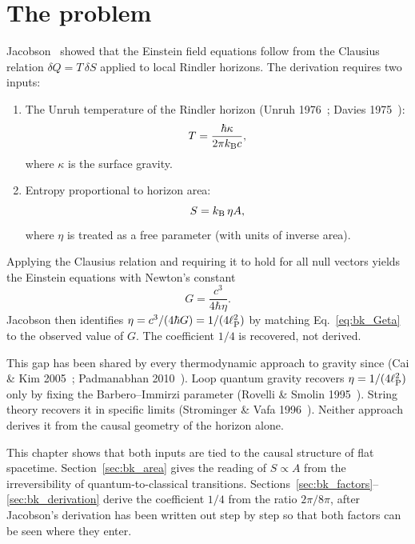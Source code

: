 \section{The problem}\label{sec:bk_problem}
Jacobson~\cite{Jacobson1995} showed that the Einstein field equations follow from the Clausius relation $\delta Q=T\,\delta S$ applied to local
Rindler horizons. The derivation requires two inputs:
\begin{enumerate}
\item The Unruh temperature of the Rindler horizon (Unruh 1976~\cite{Unruh1976}; Davies 1975~\cite{Davies1975}):
\begin{equation}
T=\frac{\hbar\kappa}{2\pi k_{\mathrm B} c},\label{eq:bk_unruh}
\end{equation}
where $\kappa$ is the surface gravity.
\item Entropy proportional to horizon area:
\begin{equation}
S=k_{\mathrm B}\,\eta A,\label{eq:bk_SetaA}
\end{equation}
where $\eta$ is treated as a free parameter (with units of inverse area).
\end{enumerate}
Applying the Clausius relation and requiring it to hold for all null vectors yields the Einstein equations with Newton's constant
\begin{equation}
G=\frac{c^3}{4\hbar\eta}.\label{eq:bk_Geta}
\end{equation}
Jacobson then identifies $\eta=c^3/(4\hbar G)=1/(4\ell_{\mathrm P}^2)$ by matching Eq.~\eqref{eq:bk_Geta} to the observed value of $G$. The coefficient $1/4$ is recovered,
not derived. \derived{}

This gap has been shared by every thermodynamic approach to gravity since (Cai \& Kim 2005~\cite{CaiKim2005}; Padmanabhan 2010~\cite{Padmanabhan2010}). Loop quantum gravity
recovers $\eta=1/(4\ell_{\mathrm P}^2)$ only by fixing the Barbero--Immirzi parameter (Rovelli \& Smolin 1995~\cite{RovelliSmolin1995}). String theory recovers it in specific limits
(Strominger \& Vafa 1996~\cite{StromingerVafa1996}). Neither approach derives it from the causal geometry of the horizon alone.

This chapter shows that both inputs are tied to the causal structure of flat spacetime. Section~\ref{sec:bk_area} gives the reading of $S\propto A$ from the
irreversibility of quantum-to-classical transitions. Sections~\ref{sec:bk_factors}--\ref{sec:bk_derivation} derive the coefficient $1/4$ from the ratio $2\pi/8\pi$,
after Jacobson's derivation has been written out step by step so that both factors can be seen where they enter.

